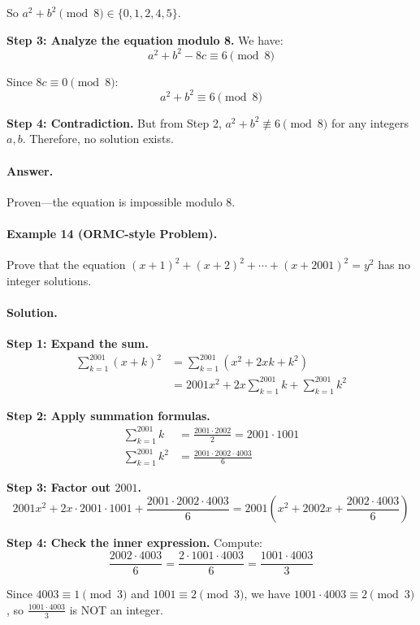 \documentclass[12pt]{extarticle}
\begin{document}
So $a^2 + b^2 \pmod{8} \in \{0, 1, 2, 4, 5\}$.

\textbf{Step 3: Analyze the equation modulo 8.} We have:
\[
a^2 + b^2 - 8c \equiv 6 \pmod{8}
\]

Since $8c \equiv 0 \pmod{8}$:
\[
a^2 + b^2 \equiv 6 \pmod{8}
\]

\textbf{Step 4: Contradiction.} But from Step 2, $a^2 + b^2 \not\equiv 6 \pmod{8}$ for any integers $a, b$. Therefore, no solution exists.

\paragraph{Answer.} Proven—the equation is impossible modulo 8.

\paragraph{Example 14 (ORMC-style Problem).} Prove that the equation $(x+1)^2 + (x+2)^2 + \cdots + (x+2001)^2 = y^2$ has no integer solutions.

\paragraph{Solution.}
\textbf{Step 1: Expand the sum.}
\begin{align*}
\sum_{k=1}^{2001} (x+k)^2 &= \sum_{k=1}^{2001} (x^2 + 2xk + k^2)\\
&= 2001x^2 + 2x\sum_{k=1}^{2001} k + \sum_{k=1}^{2001} k^2
\end{align*}

\textbf{Step 2: Apply summation formulas.}
\begin{align*}
\sum_{k=1}^{2001} k &= \frac{2001 \cdot 2002}{2} = 2001 \cdot 1001\\
\sum_{k=1}^{2001} k^2 &= \frac{2001 \cdot 2002 \cdot 4003}{6}
\end{align*}

\textbf{Step 3: Factor out $2001$.}
\[
2001x^2 + 2x \cdot 2001 \cdot 1001 + \frac{2001 \cdot 2002 \cdot 4003}{6} = 2001 \left( x^2 + 2002x + \frac{2002 \cdot 4003}{6} \right)
\]

\textbf{Step 4: Check the inner expression.} Compute:
\[
\frac{2002 \cdot 4003}{6} = \frac{2 \cdot 1001 \cdot 4003}{6} = \frac{1001 \cdot 4003}{3}
\]

Since $4003 \equiv 1 \pmod{3}$ and $1001 \equiv 2 \pmod{3}$, we have $1001 \cdot 4003 \equiv 2 \pmod{3}$, so $\frac{1001 \cdot 4003}{3}$ is NOT an integer.
\end{document}
